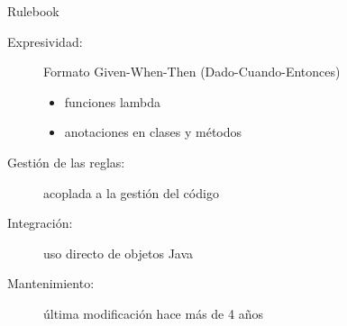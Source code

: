 \documentclass[10pt]{beamer}
\begin{document}
\begin{frame}{Rulebook}
    \begin{description}
        \item [Expresividad:] Formato Given-When-Then (Dado-Cuando-Entonces)
            \begin{itemize}
                \item funciones lambda
                \item anotaciones en clases y métodos
            \end{itemize}
        \item [Gestión de las reglas:] acoplada a la gestión del código
        \item [Integración:] uso directo de objetos Java
        \item [Mantenimiento:] última modificación hace más de 4 años
    \end{description}
\end{frame}
\begin{comment}
Rulebook expresa las reglas utilizando un formato Given-When-Then (Dado-Cuando-Entonces).Las reglas pueden crearse utilizando objetos builder, los cuales reciben funciones lambda, o madiante el usod de anotaciones en clases de Java y sus métodos.

Dado que las reglas se expresan en código Java, la gestión de las mismas está acoplada a la gestión del código. Por la misma razón, las reglas pueden hacer uso directo de los objetos de negocio.

En cuanto al mantenimiento, la última modificación al repositorio correspondiente al motor fue realizada hace más de 4 años.
\end{comment}
\end{document}
